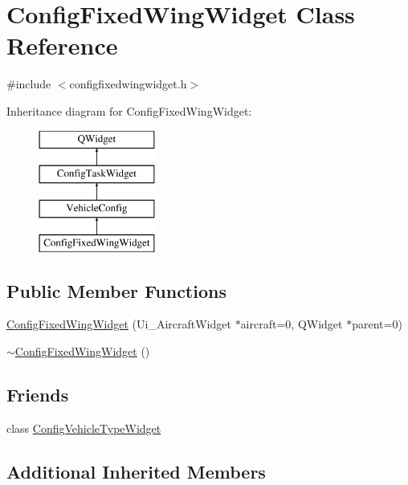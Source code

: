 \hypertarget{class_config_fixed_wing_widget}{\section{Config\-Fixed\-Wing\-Widget Class Reference}
\label{class_config_fixed_wing_widget}
}


{\ttfamily \#include $<$configfixedwingwidget.\-h$>$}

Inheritance diagram for Config\-Fixed\-Wing\-Widget\-:\begin{figure}[H]
\begin{center}
\leavevmode
\includegraphics[height=4.000000cm]{class_config_fixed_wing_widget}
\end{center}
\end{figure}
\subsection*{Public Member Functions}
\begin{DoxyCompactItemize}
\item 
\hyperlink{group___config_plugin_gaee3501121903de9f9860f69611fd07e6}{Config\-Fixed\-Wing\-Widget} (Ui\-\_\-\-Aircraft\-Widget $\ast$aircraft=0, Q\-Widget $\ast$parent=0)
\item 
\hyperlink{group___config_plugin_ga9f0af233f9470bbaab33d70b96644cef}{$\sim$\-Config\-Fixed\-Wing\-Widget} ()
\end{DoxyCompactItemize}
\subsection*{Friends}
\begin{DoxyCompactItemize}
\item 
class \hyperlink{group___config_plugin_gaf1f904d5df6619518f3228b2d5d238d0}{Config\-Vehicle\-Type\-Widget}
\end{DoxyCompactItemize}
\subsection*{Additional Inherited Members}



